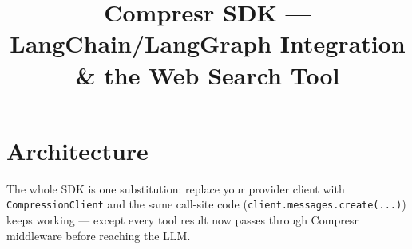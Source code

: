 \documentclass[10pt,a4paper]{article}
\title{\vspace{-3em}\Large\bfseries\color{cmpdark}Compresr SDK --- LangChain/LangGraph Integration \& the Web Search Tool}
\author{}
\date{}
\begin{document}
\maketitle
\vspace{-3em}

\section{Architecture}

\noindent The whole SDK is one substitution: replace your provider client with \texttt{CompressionClient} and the same call-site code (\texttt{client.messages.create(...)}) keeps working --- except every tool result now passes through Compresr middleware before reaching the LLM.
\end{document}
